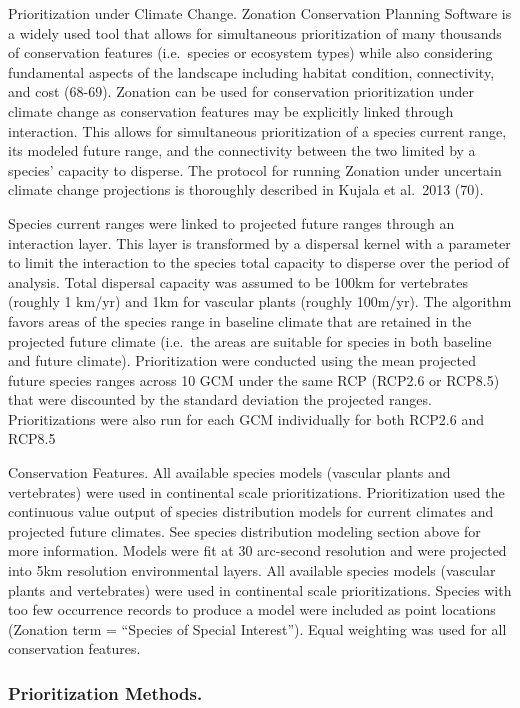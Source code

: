 \documentclass[]{article}
\begin{document}
Prioritization under Climate Change. Zonation Conservation Planning Software is a widely used tool that allows for simultaneous prioritization of many thousands of conservation features (i.e.~species or ecosystem types) while also considering fundamental aspects of the landscape including habitat condition, connectivity, and cost (68-69). Zonation can be used for conservation prioritization under climate change as conservation features may be explicitly linked through interaction. This allows for simultaneous prioritization of a species current range, its modeled future range, and the connectivity between the two limited by a species' capacity to disperse. The protocol for running Zonation under uncertain climate change projections is thoroughly described in Kujala et al.~2013 (70).

Species current ranges were linked to projected future ranges through an interaction layer. This layer is transformed by a dispersal kernel with a parameter to limit the interaction to the species total capacity to disperse over the period of analysis. Total dispersal capacity was assumed to be 100km for vertebrates (roughly 1 km/yr) and 1km for vascular plants (roughly 100m/yr). The algorithm favors areas of the species range in baseline climate that are retained in the projected future climate (i.e.~the areas are suitable for species in both baseline and future climate). Prioritization were conducted using the mean projected future species ranges across 10 GCM under the same RCP (RCP2.6 or RCP8.5) that were discounted by the standard deviation the projected ranges. Prioritizations were also run for each GCM individually for both RCP2.6 and RCP8.5

Conservation Features. All available species models (vascular plants and vertebrates) were used in continental scale prioritizations. Prioritization used the continuous value output of species distribution models for current climates and projected future climates. See species distribution modeling section above for more information. Models were fit at 30 arc-second resolution and were projected into 5km resolution environmental layers. All available species models (vascular plants and vertebrates) were used in continental scale prioritizations. Species with too few occurrence records to produce a model were included as point locations (Zonation term = ``Species of Special Interest''). Equal weighting was used for all conservation features.

\hypertarget{prioritization-methods.}{%
\subsubsection{Prioritization Methods.}\label{prioritization-methods.}}
\end{document}
